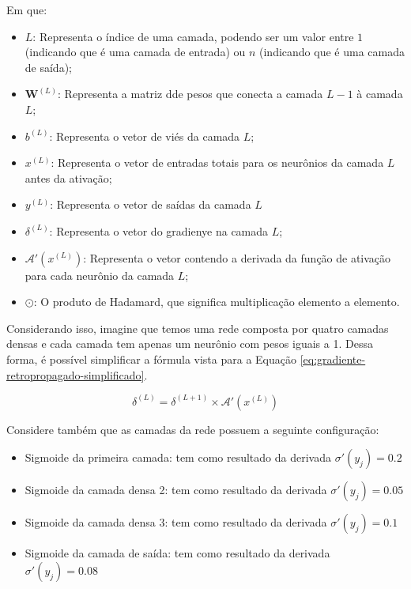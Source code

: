 Em que: 

\begin{itemize}
    \item $L$: Representa o índice de uma camada, podendo ser um valor entre $1$ (indicando que é uma camada de entrada) ou $n$ (indicando que é uma camada de saída);
    \item $\textbf{W}^{(L)}$: Representa a matriz dde pesos que conecta a camada $L - 1$ à camada $L$;
    \item $b^{(L)}$: Representa o vetor de viés da camada $L$;
    \item $x^{(L)}$: Representa o vetor de entradas totais para os neurônios da camada $L$ antes da ativação;
    \item $y^{(L)}$: Representa o vetor de saídas da camada $L$
    \item $\delta^{(L)}$: Representa o vetor do gradienye na camada $L$;
    \item $\mathcal{A}'(x^{(L)})$: Representa o vetor contendo a derivada da função de ativação para cada neurônio da camada $L$;
    \item $\odot$: O produto de Hadamard, que significa multiplicação elemento a elemento.
\end{itemize}

Considerando isso, imagine que temos uma rede composta por quatro camadas densas e cada camada tem apenas um neurônio com pesos iguais a 1. Dessa forma, é possível simplificar a fórmula vista para a Equação \ref{eq:gradiente-retropropagado-simplificado}.

\begin{equation}
        \delta^{(L)} =  \delta^{(L+1)} \times \mathcal{A}'(x^{(L)})
        \label{eq:gradiente-retropropagado-simplificado}
\end{equation}

Considere também que as camadas da rede possuem a seguinte configuração:

\begin{itemize}
    \item Sigmoide da primeira camada: tem como resultado da derivada $\sigma'(y_j) = 0.2$
    \item Sigmoide da camada densa 2: tem como resultado da derivada $\sigma'(y_j) = 0.05$
    \item Sigmoide da camada densa 3: tem como resultado da derivada $\sigma'(y_j) = 0.1$
    \item Sigmoide da camada de saída: tem como resultado da derivada $\sigma'(y_j) = 0.08$
\end{itemize}

